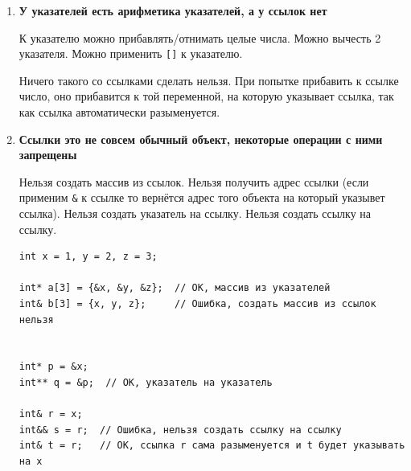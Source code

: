 \documentclass{article}
\begin{document}
\begin{enumerate}
\item \textbf{У указателей есть арифметика указателей, а у ссылок нет}

К указателю можно прибавлять/отнимать целые числа. Можно вычесть 2 указателя. Можно применить \texttt{[]} к указателю.

Ничего такого со ссылками сделать нельзя. При попытке прибавить к ссылке число, оно прибавится к той 
переменной, на которую указывает ссылка, так как ссылка автоматически разыменуется.

\item \textbf{Ссылки это не совсем обычный объект, некоторые операции с ними запрещены}

Нельзя создать массив из ссылок. Нельзя получить адрес ссылки (если применим \texttt{\&} к ссылке то вернётся адрес того объекта на который указывет ссылка). Нельзя создать указатель на ссылку. Нельзя создать ссылку на ссылку.
\begin{lstlisting}
int x = 1, y = 2, z = 3;

int* a[3] = {&x, &y, &z};  // ОК, массив из указателей
int& b[3] = {x, y, z};     // Ошибка, создать массив из ссылок нельзя


int* p = &x;
int** q = &p;  // ОК, указатель на указатель

int& r = x;
int&& s = r;  // Ошибка, нельзя создать ссылку на ссылку
int& t = r;   // ОК, ссылка r сама разыменуется и t будет указывать на x 
\end{lstlisting}
\end{enumerate}

\newpage
\end{document}
